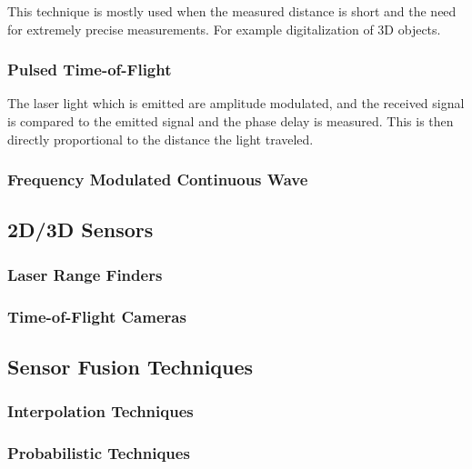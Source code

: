 This technique is mostly used when the measured distance is short and the need for
extremely precise measurements. For example digitalization of 3D objects.


\subsubsection{Pulsed Time-of-Flight}
The laser light which is emitted are amplitude modulated, and the received signal is
compared to the emitted signal and the phase delay is measured. This is then directly
proportional to the distance the light traveled. 


\subsubsection{Frequency Modulated Continuous Wave}



\subsection{2D/3D Sensors}



\subsubsection{Laser Range Finders}




\subsubsection{Time-of-Flight Cameras}




\subsection{Sensor Fusion Techniques}



\subsubsection{Interpolation Techniques}



\subsubsection{Probabilistic Techniques}




